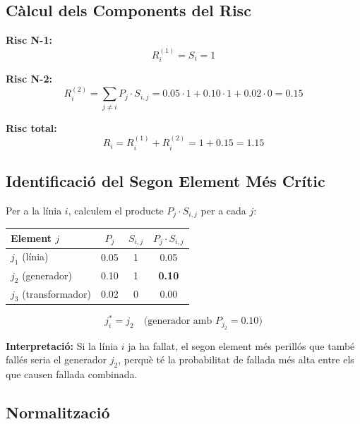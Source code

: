 \documentclass[11pt,a4paper]{article}
\begin{document}
\subsection{Càlcul dels Components del Risc}

\textbf{Risc N-1:}
\begin{equation}
R_i^{(1)} = S_i = 1
\end{equation}

\textbf{Risc N-2:}
\begin{equation}
R_i^{(2)} = \sum_{j \neq i} P_j \cdot S_{i,j} = 0.05 \cdot 1 + 0.10 \cdot 1 + 0.02 \cdot 0 = 0.15
\end{equation}

\textbf{Risc total:}
\begin{equation}
R_i = R_i^{(1)} + R_i^{(2)} = 1 + 0.15 = 1.15
\end{equation}

\subsection{Identificació del Segon Element Més Crític}

Per a la línia $i$, calculem el producte $P_j \cdot S_{i,j}$ per a cada $j$:

\begin{table}[htbp]
\centering
\begin{tabular}{lccc}
\toprule
\textbf{Element $j$} & $P_j$ & $S_{i,j}$ & $P_j \cdot S_{i,j}$ \\
\midrule
$j_1$ (línia) & 0.05 & 1 & 0.05 \\
$j_2$ (generador) & 0.10 & 1 & \textbf{0.10} \\
$j_3$ (transformador) & 0.02 & 0 & 0.00 \\
\bottomrule
\end{tabular}
\end{table}

\begin{equation}
j^*_i = j_2 \quad \text{(generador amb } P_{j_2} = 0.10\text{)}
\end{equation}

\textbf{Interpretació:} Si la línia $i$ ja ha fallat, el segon element més perillós que també fallés seria el generador $j_2$, perquè té la probabilitat de fallada més alta entre els que causen fallada combinada.

\subsection{Normalització}
\end{document}
